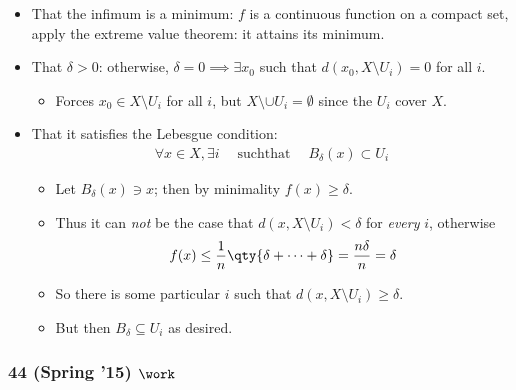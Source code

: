 \begin{solution}
\begin{itemize}
  \begin{itemize}
  \tightlist
  \item
    That the infimum is a minimum: \(f\) is a continuous function on a
    compact set, apply the extreme value theorem: it attains its
    minimum.
  \item
    That \(\delta > 0\): otherwise, \(\delta = 0 \implies \exists x_0\)
    such that \(d(x_0, X\setminus U_i) = 0\) for all \(i\).

    \begin{itemize}
    \tightlist
    \item
      Forces \(x_0 \in X\setminus U_i\) for all \(i\), but
      \(X\setminus \cup U_i = \emptyset\) since the \(U_i\) cover \(X\).
    \end{itemize}
  \item
    That it satisfies the Lebesgue condition:
    \begin{align*}\forall x\in X, \exists i {\quad \operatorname{such that} \quad} B_\delta(x) \subset U_i\end{align*}

    \begin{itemize}
    \tightlist
    \item
      Let \(B_\delta(x) \ni x\); then by minimality
      \(f(x) \geq \delta\).
    \item
      Thus it can \emph{not} be the case that
      \(d(x, X\setminus U_i) < \delta\) for \emph{every} \(i\),
      otherwise
      \begin{align*}f(x) \leq {1\over n}\qty{ \delta + \cdots + \delta} = {n\delta \over n} = \delta\end{align*}
    \item
      So there is some particular \(i\) such that
      \(d(x, X\setminus U_i) \geq \delta\).
    \item
      But then \(B_\delta \subseteq U_i\) as desired.
    \end{itemize}
  \end{itemize}
\end{itemize}

\end{solution}

\hypertarget{spring-15-work}{%
\subsubsection{\texorpdfstring{44 (Spring '15)
\(\work\)}{44 (Spring '15) \textbackslash work}}\label{spring-15-work}}

